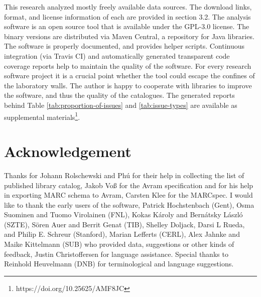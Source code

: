 This research analyzed mostly freely available data sources. The download links, format, and license information of each are provided in section 3.2. The analysis software is an open source tool that is available under the GPL-3.0 license. The binary versions are distributed via Maven Central, a repository for Java libraries. The software is properly documented, and provides helper scripts. Continuous integration (via Travis CI) and automatically generated transparent code coverage reports help to maintain the quality of the software. For every research software project it is a crucial point whether the tool could escape the confines of the laboratory walls. The author is happy to cooperate with libraries to improve the software, and thus the quality of the catalogues. The generated reports behind Table \ref{tab:proportion-of-issues} and \ref{tab:issue-types} are available as supplemental materials\footnote{https://doi.org/10.25625/AMF8JC}.

\section{Acknowledgement}
Thanks for Johann Rolschewski and Phú for their help in collecting the list of published library catalog, Jakob Voß for the Avram specification and for his help in exporting MARC schema to Avram, Carsten Klee for the MARCspec. I would like to thank the early users of the software, Patrick Hochstenbach (Gent), Osma Suominen and Tuomo Virolainen (FNL), Kokas Károly and Bernátsky László (SZTE), Sören Auer and Berrit Genat (TIB), Shelley Doljack, Darsi L Rueda, and Philip E. Schreur (Stanford), Marian Lefferts (CERL), Alex Jahnke and Maike Kittelmann (SUB) who provided data, suggestions or other kinds of feedback, Justin Christoffersen for language assistance. Special thanks to Reinhold Heuvelmann (DNB) for terminological and language suggestions.

% 
% 
